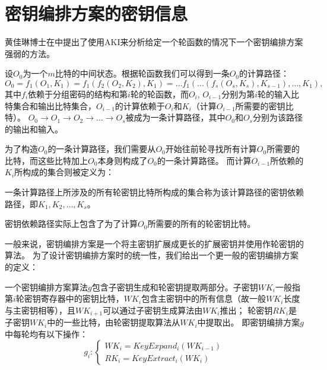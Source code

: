 \section{密钥编排方案的密钥信息}
黄佳琳博士在中提出了使用AKI来分析给定一个轮函数的情况下一个密钥编排方案强弱的方法。
\begin{defn}[计算路径]
    设$O_0$为一个$m$比特的中间状态。根据轮函数我们可以得到一条$O_0$的计算路径：
    $$O_0=f_1(O_1,K_1)=f_1(f_2(O_2,K_2),K_1)=\dots f_1(\dots(f_s(O_s,K_s),K_{s-1}),\dots,K_1),$$
    其中$f_i$依赖于分组密码的结构和第$i$轮的轮函数，而$O_i$, $O_{i-1}$分别为第$i$轮的输入比特集合和输出比特集合，$O_{i-1}$的计算依赖于$O_i$和$K_i$（计算$O_{i-1}$所需要的密钥比特）。
    $O_0\rightarrow O_1\rightarrow O_2\rightarrow\dots\rightarrow O_s$被成为一条计算路径，其中$O_0$和$O_s$分别为该路径的输出和输入。
\end{defn}
为了构造$O_0$的一条计算路径，我们需要从$O_0$开始往前轮寻找所有计算$O_0$所需要的比特，而这些比特加上$O_0$本身则构成了$O_0$的一条计算路径。
而计算$O_{i-1}$所依赖的$K_i$所构成的集合则被定义为：
\begin{defn}[密钥依赖路径]
    一条计算路径上所涉及的所有轮密钥比特所构成的集合称为该计算路径的密钥依赖路径，即$K_1,K_2,\dots,K_s$。
\end{defn}
密钥依赖路径实际上包含了为了计算$O_0$所需要的所有的轮密钥比特。

一般来说，密钥编排方案是一个将主密钥扩展成更长的扩展密钥并使用作轮密钥的算法。
为了设计密钥编排方案时的统一性，我们给出一个更一般的密钥编排方案的定义：
\begin{defn}[密钥编排方案]
    一个密钥编排方案算法$g$包含子密钥生成和轮密钥提取两部分。子密钥$WK_i$一般指第$i$轮密钥寄存器中的密钥比特，$WK_i$包含主密钥中的所有信息（故一般$WK_i$长度与主密钥相等），且$WK_{i+1}$可以通过子密钥生成算法由$WK_i$推出；
    轮密钥$RK_i$是子密钥$WK_i$中的一些比特，由轮密钥提取算法从$WK_i$中提取出。
    即密钥编排方案$g$中每轮均有以下操作：
    $$g_i:\begin{cases}
        WK_i=KeyExpand_i(WK_{i-1})\\
        RK_i=KeyExtract_i(WK_i)
    \end{cases}$$
\end{defn}

